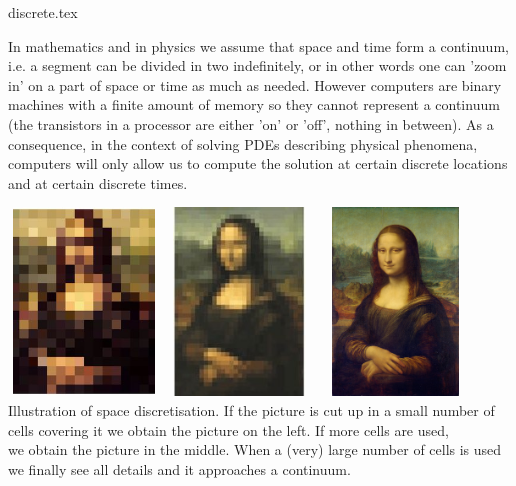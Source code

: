 \begin{flushright} {\tiny {\color{gray} discrete.tex}} \end{flushright}

In mathematics and in physics we assume that space and time form a continuum, i.e.
a segment can be divided in two indefinitely, or in other words one can 'zoom in'
on a part of space or time as much as needed. 
However computers are binary machines with a finite amount of memory so they 
cannot represent a continuum (the transistors in a processor are either 'on' or 'off', 
nothing in between). As a consequence, in the context of solving PDEs
describing physical phenomena, computers will only allow us to compute the solution 
at certain discrete locations and at certain discrete times. 

\begin{center}
\includegraphics[width=4cm,height=5cm]{images/discrete/monalisa1.jpg}
\includegraphics[width=4cm,height=5cm]{images/discrete/monalisa2.jpg}
\includegraphics[width=4cm,height=5cm]{images/discrete/monalisa3.jpg}\\
{\captionfont Illustration of space discretisation. If the picture is cut up 
in a small number of cells covering it we obtain the picture on the left.
If more cells are used,\\
 we obtain the picture in the middle. When a (very) large
number of cells is used we finally see all details and it approaches a continuum.}
\end{center}


